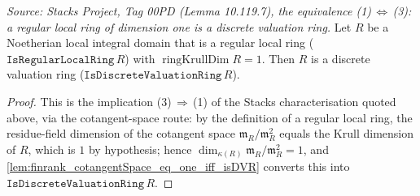 \begin{lemma}

  \label{lem:regularLocal_dim_one_isDVR}
  \textit{Source: Stacks Project, Tag 00PD (Lemma 10.119.7), the
  equivalence (1)\,\(\Leftrightarrow\)\,(3): a regular local ring of
  dimension one is a discrete valuation ring.}
  Let \(R\) be a Noetherian local integral domain that is a regular local
  ring (\(\texttt{IsRegularLocalRing}\,R\)) with
  \(\operatorname{ringKrullDim} R = 1\). Then \(R\) is a discrete valuation
  ring (\(\texttt{IsDiscreteValuationRing}\,R\)).
\end{lemma}

\begin{proof}
  \leanok
  This is the implication (3)\,\(\Rightarrow\)\,(1) of the Stacks
  characterisation quoted above, via the cotangent-space route: by the
  definition of a regular local ring, the residue-field dimension of the
  cotangent space \(\mathfrak m_R / \mathfrak m_R^2\) equals the Krull
  dimension of \(R\), which is \(1\) by hypothesis; hence
  \(\dim_{\kappa(R)} \mathfrak m_R / \mathfrak m_R^2 = 1\), and
  \cref{lem:finrank_cotangentSpace_eq_one_iff_isDVR}
  converts this into \(\texttt{IsDiscreteValuationRing}\,R\).
\end{proof}

